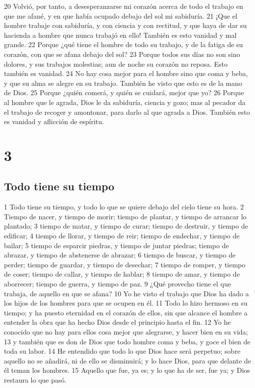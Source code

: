 20 Volvió, por tanto, a desesperanzarse mi corazón acerca de todo el trabajo en que me afané, y en que había ocupado debajo del sol mi sabiduría.
21 ¡Que el hombre trabaje con sabiduría, y con ciencia y con rectitud, y que haya de dar su hacienda a hombre que nunca trabajó en ello! También es esto vanidad y mal grande.
22 Porque ¿qué tiene el hombre de todo su trabajo, y de la fatiga de su corazón, con que se afana debajo del sol?
23 Porque todos sus días no son sino dolores, y sus trabajos molestias; aun de noche su corazón no reposa. Esto también es vanidad.
24 No hay cosa mejor para el hombre sino que coma y beba, y que su alma se alegre en su trabajo. También he visto que esto es de la mano de Dios.
25 Porque ¿quién comerá, y quién se cuidará, mejor que yo?
26 Porque al hombre que le agrada, Dios le da sabiduría, ciencia y gozo; mas al pecador da el trabajo de recoger y amontonar, para darlo al que agrada a Dios. También esto es vanidad y aflicción de espíritu.

\chapter{3}

\section*{Todo tiene su tiempo}

1 Todo tiene su tiempo, y todo lo que se quiere debajo del cielo tiene su hora.
2 Tiempo de nacer, y tiempo de morir; tiempo de plantar, y tiempo de arrancar lo plantado;
3 tiempo de matar, y tiempo de curar; tiempo de destruir, y tiempo de edificar;
4 tiempo de llorar, y tiempo de reir; tiempo de endechar, y tiempo de bailar;
5 tiempo de esparcir piedras, y tiempo de juntar piedras; tiempo de abrazar, y tiempo de abstenerse de abrazar;
6 tiempo de buscar, y tiempo de perder; tiempo de guardar, y tiempo de desechar;
7 tiempo de romper, y tiempo de coser; tiempo de callar, y tiempo de hablar;
8 tiempo de amar, y tiempo de aborrecer; tiempo de guerra, y tiempo de paz.
9 ¿Qué provecho tiene el que trabaja, de aquello en que se afana?
10 Yo he visto el trabajo que Dios ha dado a los hijos de los hombres para que se ocupen en él.
11 Todo lo hizo hermoso en su tiempo; y ha puesto eternidad en el corazón de ellos, sin que alcance el hombre a entender la obra que ha hecho Dios desde el principio hasta el fin.
12 Yo he conocido que no hay para ellos cosa mejor que alegrarse, y hacer bien en su vida;
13 y también que es don de Dios que todo hombre coma y beba, y goce el bien de toda su labor.
14 He entendido que todo lo que Dios hace será perpetuo; sobre aquello no se añadirá, ni de ello se disminuirá; y lo hace Dios, para que delante de él teman los hombres.
15 Aquello que fue, ya es; y lo que ha de ser, fue ya; y Dios restaura lo que pasó.

